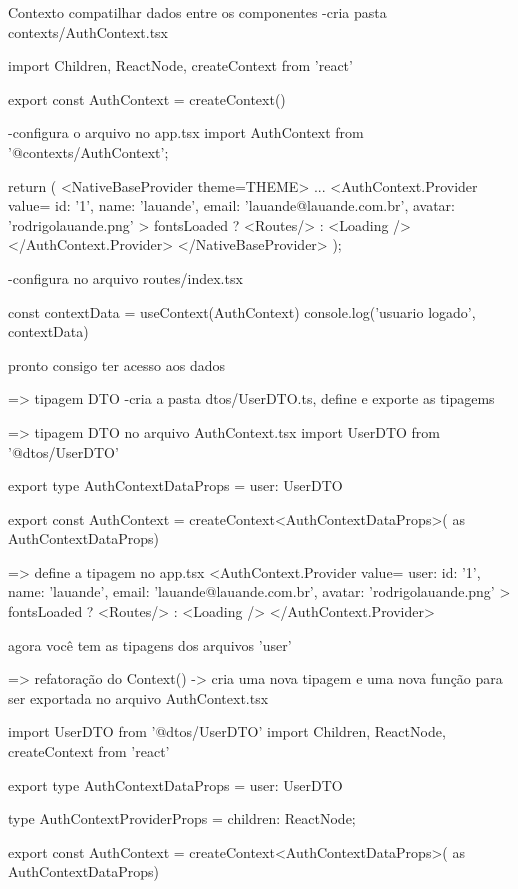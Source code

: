 {{Contexto compatilhar dados entre os componentes
-cria pasta contexts/AuthContext.tsx

import { Children, ReactNode, createContext } from 'react'

export const AuthContext = createContext({})

-configura o arquivo no app.tsx
import { AuthContext } from '@contexts/AuthContext';

  return (
    <NativeBaseProvider theme={THEME}>
        ...
        <AuthContext.Provider value={{
          id: '1',
          name: 'lauande',
          email: 'lauande@lauande.com.br',
          avatar: 'rodrigolauande.png'
        }}>
          {fontsLoaded ? <Routes/> : <Loading /> }
        </AuthContext.Provider>
    </NativeBaseProvider>
  );
}

-configura no arquivo routes/index.tsx

const contextData = useContext(AuthContext)
console.log('usuario logado', contextData)

pronto consigo ter acesso aos dados

=> tipagem DTO
-cria a pasta dtos/UserDTO.ts, define e exporte as tipagems

=> tipagem DTO no arquivo AuthContext.tsx
import { UserDTO } from '@dtos/UserDTO'

export type AuthContextDataProps = {
    user: UserDTO
}

export const AuthContext = createContext<AuthContextDataProps>({} as AuthContextDataProps)

=> define a tipagem no app.tsx
        <AuthContext.Provider value={{
          user: {
            id: '1',
            name: 'lauande',
            email: 'lauande@lauande.com.br',
            avatar: 'rodrigolauande.png'
          }
        }}>
          {fontsLoaded ? <Routes/> : <Loading /> }
        </AuthContext.Provider>

        agora você tem as tipagens dos arquivos 'user'


=> refatoração do Context()
-> cria uma nova tipagem e uma nova função para ser exportada no arquivo AuthContext.tsx

import { UserDTO } from '@dtos/UserDTO'
import { Children, ReactNode, createContext } from 'react'

export type AuthContextDataProps = {
    user: UserDTO
}

type AuthContextProviderProps = {
    children: ReactNode;
}

export const AuthContext = createContext<AuthContextDataProps>({} as AuthContextDataProps)

}
